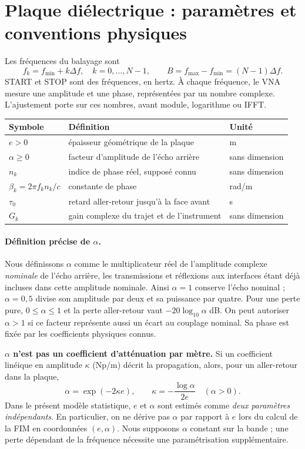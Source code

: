 \documentclass[11pt,a4paper]{article}
\begin{document}
\clearpage
\section{Plaque diélectrique : paramètres et conventions physiques}

Les fréquences du balayage sont
\begin{equation}
 f_k=f_{\min}+k\Delta f,\quad k=0,\ldots,N-1,\qquad
 B=f_{\max}-f_{\min}=(N-1)\Delta f.
\end{equation}
START et STOP sont des fréquences, en hertz. À chaque fréquence, le VNA
mesure une amplitude et une phase, représentées par un nombre complexe.
L'ajustement porte sur ces nombres, avant module, logarithme ou IFFT.

\begin{center}
\begin{tabular}{lll}
\toprule
Symbole & Définition & Unité \\
\midrule
$e>0$ & épaisseur géométrique de la plaque & m \\
$\alpha\geq0$ & facteur d'amplitude de l'écho arrière & sans dimension \\
$n_k$ & indice de phase réel, supposé connu & sans dimension \\
$\beta_k=2\pi f_kn_k/c$ & constante de phase & rad/m \\
$\tau_0$ & retard aller-retour jusqu'à la face avant & s \\
$G_k$ & gain complexe du trajet et de l'instrument & sans dimension \\
\bottomrule
\end{tabular}
\end{center}

\paragraph{Définition précise de $\alpha$.}
Nous définissons $\alpha$ comme le multiplicateur réel de l'amplitude
complexe \emph{nominale} de l'écho arrière, les transmissions et réflexions
aux interfaces étant déjà incluses dans cette amplitude nominale.
Ainsi $\alpha=1$ conserve l'écho nominal ; $\alpha=0{,}5$ divise son
amplitude par deux et sa puissance par quatre. Pour une perte pure,
$0\leq\alpha\leq1$ et la perte aller-retour vaut $-20\log_{10}\alpha$ dB.
On peut autoriser $\alpha>1$ si ce facteur représente aussi un écart au
couplage nominal. Sa phase est fixée par les coefficients physiques connus.

\textbf{$\alpha$ n'est pas un coefficient d'atténuation par mètre.}
Si un coefficient linéique en amplitude $\kappa$ (Np/m) décrit la propagation,
alors, pour un aller-retour dans la plaque,
\begin{equation}\label{eq:conversion}
 \alpha=\exp(-2\kappa e),\qquad
 \kappa=-\frac{\log\alpha}{2e}\quad(\alpha>0).
\end{equation}
Dans le présent modèle statistique, $e$ et $\alpha$ sont estimés comme
\emph{deux paramètres indépendants}. En particulier, on ne dérive pas
$\alpha$ par rapport à $e$ lors du calcul de la FIM en coordonnées $(e,\alpha)$.
Nous supposons $\alpha$ constant sur la bande ; une perte dépendant de
la fréquence nécessite une paramétrisation supplémentaire.
\end{document}
